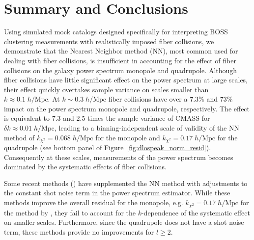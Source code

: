 \section{Summary and Conclusions} \label{sec:summary}
Using simulated mock catalogs designed specifically for interpreting BOSS 
clustering measurements with realistically imposed fiber collisions, we 
demonstrate that the Nearest Neighbor method (NN), most common used for dealing 
with fiber collisions, is insufficient in accounting for the effect of 
fiber collisions on the galaxy power spectrum monopole and quadrupole.  
Although fiber collisions have little significant effect on 
the power spectrum at large scales, their effect quickly overtakes sample 
variance on scales smaller than $k \approx 0.1 \;h/\mathrm{Mpc}$. At  $k \sim 0.3 \;h/\mathrm{Mpc}$
fiber collisions have over a $7.3\%$ and $73\%$ 
impact on the power spectrum monopole and quadrupole, respectively. The 
effect is equivalent to $7.3$ and $2.5$ times the sample variance of CMASS for 
$\delta k \approx 0.01\;h/\mathrm{Mpc}$, leading to a binning-independent scale of validity of the NN method of 
$k_{\chi^2}=0.068\;h/\mathrm{Mpc}$ for the monopole and $k_{\chi^2}=0.17\;h/\mathrm{Mpc}$ for the 
quadrupole (see bottom panel of Figure~\ref{fig:dlospeak_norm_resid}).  
Consequently at these scales, measurements of the power spectrum becomes 
dominated by the systematic effects of fiber collisions. 

Some recent methods (\citealt{Beutler:2014aa,Gil-Marin:2014aa,Beutler:2016aa,Grieb:2016aa,Gil-Marin:2016aa}) have supplemented
the NN method with adjustments to the constant shot noise term in the power spectrum 
estimator. While these methods improve the overall residual for the monopole, e.g. $k_{\chi^2}=0.17\;h/\mathrm{Mpc}$ for the method by \cite{Gil-Marin:2014aa}, they fail to account for the $k$-dependence of the systematic effect on smaller 
scales. Furthermore, since the quadrupole does not have a shot 
noise term, these methods provide no improvements for $l \geq 2$. 

